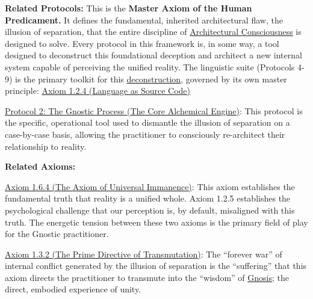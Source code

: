 \documentclass{article}
\begin{document}
\begin{nobullet}
    \item \textbf{Related Protocols:} This is the \textbf{Master Axiom of the Human Predicament.} It defines the fundamental, inherited architectural flaw, the illusion of separation, that the entire discipline of \hyperlink{gloss:architectural_consciousness}{Architectural Consciousness} is designed to solve. Every protocol in this framework is, in some way, a tool designed to deconstruct this foundational deception and architect a new internal system capable of perceiving the unified reality. The linguistic suite (Protocols 4-9) is the primary toolkit for this \hyperlink{gloss:deconstruction}{deconstruction}, governed by its own master principle: \hyperref[axiom_1_2_4_language_as_source_code]{Axiom 1.2.4 (Language as Source Code)}
        \begin{nobullet}
            \item \hyperref[protocol_2_the_gnostic_process_the_core_alchemical_engine]{Protocol 2: The Gnostic Process (The Core Alchemical Engine)}: This protocol is the specific, operational tool used to dismantle the illusion of separation on a case-by-case basis, allowing the practitioner to consciously re-architect their relationship to reality.
        \end{nobullet}

    \item \textbf{Related Axioms:}
        \begin{nobullet}
            \item \hyperref[axiom_1_6_4_the_axiom_of_universal_immanence]{Axiom 1.6.4 (The Axiom of Universal Immanence)}: This axiom establishes the fundamental truth that reality is a unified whole. Axiom 1.2.5 establishes the psychological challenge that our perception is, by default, misaligned with this truth. The energetic tension between these two axioms is the primary field of play for the Gnostic practitioner.
            \item \hyperref[axiom_1_3_2_the_prime_directive_of_transmutation]{Axiom 1.3.2 (The Prime Directive of Transmutation)}: The ``forever war'' of internal conflict generated by the illusion of separation is the ``suffering'' that this axiom directs the practitioner to transmute into the ``wisdom'' of \hyperlink{gloss:gnosis}{Gnosis}; the direct, embodied experience of unity.
        \end{nobullet}

\end{nobullet}
\end{document}
